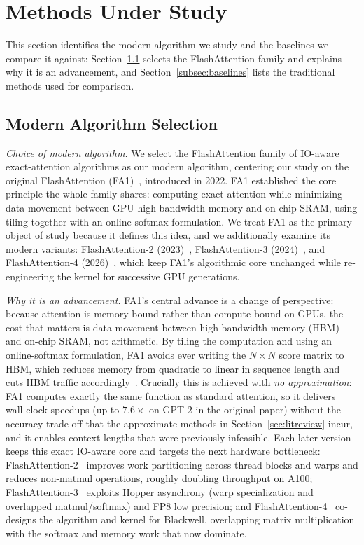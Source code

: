 \documentclass[sigconf,nonacm]{acmart}
\newcommand{\lead}[1]{\textit{#1}\quad}
\begin{document}
\section{Methods Under Study}
\label{sec:methods}
This section identifies the modern algorithm we study and the baselines we
compare it against: Section~\ref{subsec:modern} selects the FlashAttention family
and explains why it is an advancement, and Section~\ref{subsec:baselines} lists
the traditional methods used for comparison.

\subsection{Modern Algorithm Selection}
\label{subsec:modern}
\lead{Choice of modern algorithm.}
We select the FlashAttention family of IO-aware exact-attention algorithms as our
modern algorithm, centering our study on the original FlashAttention
(FA1)~\cite{dao2022flashattention}, introduced in 2022. FA1 established the core
principle the whole family shares: computing exact attention while minimizing
data movement between GPU high-bandwidth memory and on-chip SRAM, using tiling
together with an online-softmax formulation. We treat FA1 as the primary object
of study because it defines this idea, and we additionally examine its modern
variants: FlashAttention-2 (2023)~\cite{dao2023flashattention2},
FlashAttention-3 (2024)~\cite{shah2024flashattention3}, and FlashAttention-4
(2026)~\cite{zadouri2026flashattention4}, which keep FA1's algorithmic core
unchanged while re-engineering the kernel for successive GPU generations.

\lead{Why it is an advancement.}
FA1's central advance is a change of perspective: because attention is
memory-bound rather than compute-bound on GPUs, the cost that matters is data
movement between high-bandwidth memory (HBM) and on-chip SRAM, not arithmetic.
By tiling the computation and using an online-softmax formulation, FA1 avoids
ever writing the $N\times N$ score matrix to HBM, which reduces memory from
quadratic to linear in sequence length and cuts HBM traffic
accordingly~\cite{dao2022flashattention}. Crucially this is achieved with
\emph{no approximation}: FA1 computes exactly the same function as standard
attention, so it delivers wall-clock speedups (up to $7.6\times$ on GPT-2 in the
original paper) without the accuracy trade-off that the approximate methods in
Section~\ref{sec:litreview} incur, and it enables context lengths that were
previously infeasible. Each later version keeps this exact IO-aware core and
targets the next hardware bottleneck:
FlashAttention-2~\cite{dao2023flashattention2} improves work partitioning across
thread blocks and warps and reduces non-matmul operations, roughly doubling
throughput on A100; FlashAttention-3~\cite{shah2024flashattention3} exploits
Hopper asynchrony (warp specialization and overlapped matmul/softmax) and FP8
low precision; and FlashAttention-4~\cite{zadouri2026flashattention4} co-designs
the algorithm and kernel for Blackwell, overlapping matrix multiplication with
the softmax and memory work that now dominate.
\end{document}
